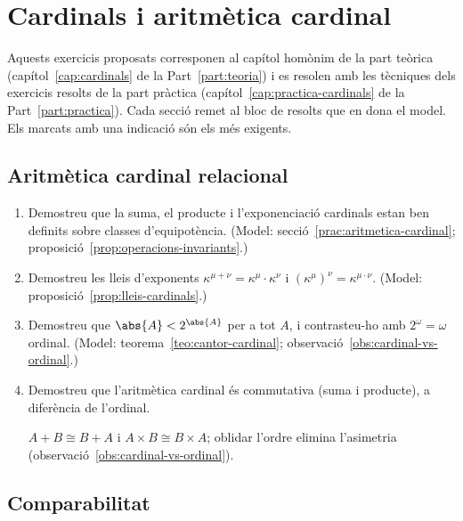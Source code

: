 \chapter{Cardinals i aritmètica cardinal}\label{cap:exercicis-cardinals}

Aquests exercicis proposats corresponen al capítol homònim de la part teòrica (capítol~\ref{cap:cardinals} de la Part~\ref{part:teoria}) i es resolen amb les tècniques dels exercicis resolts de la part pràctica (capítol~\ref{cap:practica-cardinals} de la Part~\ref{part:practica}). Cada secció remet al bloc de resolts que en dona el model. Els marcats amb una indicació són els més exigents.

\section{Aritmètica cardinal relacional}

\begin{enumerate}
  \item Demostreu que la suma, el producte i l'exponenciació cardinals estan ben definits sobre classes d'equipotència. (Model: secció~\ref{prac:aritmetica-cardinal}; proposició~\ref{prop:operacions-invariants}.)

  \item Demostreu les lleis d'exponents \(\kappa^{\mu+\nu}=\kappa^\mu\cdot\kappa^\nu\) i \((\kappa^\mu)^\nu=\kappa^{\mu\cdot\nu}\). (Model: proposició~\ref{prop:lleis-cardinals}.)

  \item Demostreu que \(\abs{A}<2^{\abs{A}}\) per a tot \(A\), i contrasteu-ho amb \(2^\omega=\omega\) ordinal. (Model: teorema~\ref{teo:cantor-cardinal}; observació~\ref{obs:cardinal-vs-ordinal}.)

  \item Demostreu que l'aritmètica cardinal és commutativa (suma i producte), a diferència de l'ordinal. \begin{indicacio}\(A+B\cong B+A\) i \(A\times B\cong B\times A\); oblidar l'ordre elimina l'asimetria (observació~\ref{obs:cardinal-vs-ordinal}).\end{indicacio}
\end{enumerate}

\section{Comparabilitat}

